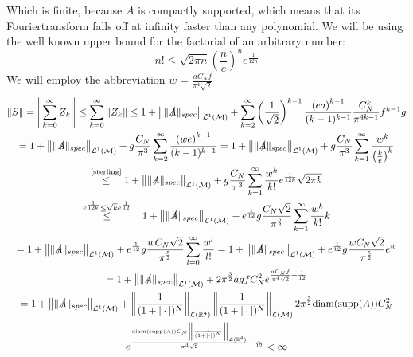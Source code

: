 \documentclass[a4paper,12pt]{article}
\newcommand{\letext}[1]{\ensuremath{\stackrel{\text{#1}}{\le}}}
\begin{document}
Which is finite, because \(A\) is compactly supported, which means that its Fouriertransform falls off at infinity faster than any polynomial.
We will be using the well known upper bound for the factorial of an arbitrary number:
\begin{equation}\label{sterling}
n!\le \sqrt{2\pi n} \left(\frac{n}{e}\right)^n e^\frac{1}{12n}
\end{equation}
We will employ the abbreviation \(w= \frac{ a C_N f}{\pi^4\sqrt{2} }\)
\begin{multline}
\|S\|=\left\|\sum_{k=0}^\infty Z_k \right\|\le \sum_{k=0}^\infty \left\|Z_k \right\| \le 1+ \left\| \|\slashed{A}\|_{spec} \right\|_{\mathcal{L}^1(\mathcal{M})}+ \sum_{k=2}^\infty \left(\frac{1}{\sqrt{2} }\right)^{k-1} \frac{\left(e a\right)^{k-1}}{(k-1)^{k-1}} \frac{ C_N^k}{\pi^{4k-1}}  f^{k-1}  g\\
=1+ \left\| \|\slashed{A}\|_{spec} \right\|_{\mathcal{L}^1(\mathcal{M})}+g\frac{ C_N}{\pi^{3}} \sum_{k=2}^\infty \frac{\left(w e\right)^{k-1}}{(k-1)^{k-1}}
=1+ \left\| \|\slashed{A}\|_{spec} \right\|_{\mathcal{L}^1(\mathcal{M})}+g\frac{ C_N}{\pi^{3}} \sum_{k=1}^\infty \frac{w^{k}}{\left(\frac{k}{e}\right)^{k}}   \\
\letext{\eqref{sterling}}1+ \left\| \|\slashed{A}\|_{spec} \right\|_{\mathcal{L}^1(\mathcal{M})}+g\frac{ C_N}{\pi^{3}} \sum_{k=1}^\infty \frac{w^{k}}{k!} e^{\frac{1}{12k}} \sqrt{2\pi k} \\
\stackrel{e^{\frac{1}{12k}}\le \sqrt{k} e^{\frac{1}{12}}}{\le} \hspace{0.3cm} 1+ \left\| \|\slashed{A}\|_{spec} \right\|_{\mathcal{L}^1(\mathcal{M})}+e^{\frac{1}{12}} g\frac{ C_N\sqrt{2}}{\pi^{\frac{5}{2}}} \sum_{k=1}^\infty \frac{w^{k}}{k!}  k\\
=1+ \left\| \|\slashed{A}\|_{spec} \right\|_{\mathcal{L}^1(\mathcal{M})}+e^{\frac{1}{12}} g\frac{w C_N\sqrt{2}}{\pi^{\frac{5}{2}}} \sum_{l=0}^\infty \frac{w^{l}}{l!} 
=1+ \left\| \|\slashed{A}\|_{spec} \right\|_{\mathcal{L}^1(\mathcal{M})}+e^{\frac{1}{12}} g\frac{w C_N\sqrt{2}}{\pi^{\frac{5}{2}}} e^{w}\\
=1+ \left\| \|\slashed{A}\|_{spec} \right\|_{\mathcal{L}^1(\mathcal{M})}+ 2 \pi^{\frac{3}{2}}a g f  C^2_N e^{\frac{ a C_N f}{\pi^4\sqrt{2}}+\frac{1}{12}}\\
= 1+ \left\| \|\slashed{A}\|_{spec} \right\|_{\mathcal{L}^1(\mathcal{M})}+ \left\|\frac{1}{(1+|\cdot |)^N} \right\|_{\mathcal{L}(\mathbb{R}^4)} \left\|\frac{1}{(1+|\cdot |)^N} \right\|_{\mathcal{L}(\mathcal{M})} 2 \pi^{\frac{3}{2}}\text{diam}(\text{supp}(A))    C^2_N \\
 e^{\frac{ \text{diam}(\text{supp}(A)) C_N \left\|\frac{1}{(1+|\cdot |)^N} \right\|_{\mathcal{L}(\mathbb{R}^4)}}{\pi^4\sqrt{2}}+\frac{1}{12}} <\infty
\end{multline}
\end{document}
